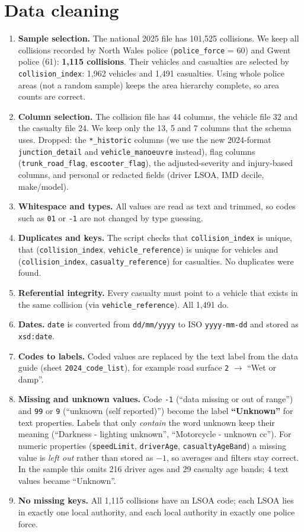 \documentclass[10.5pt,a4paper]{article}
\begin{document}
\section{Data cleaning}
\begin{enumerate}[nosep]
\item \textbf{Sample selection.} The national 2025 file has 101,525 collisions. We keep all collisions recorded by North Wales police (\texttt{police\_force} = 60) and Gwent police (61): \textbf{1,115 collisions}. Their vehicles and casualties are selected by \texttt{collision\_index}: 1,962 vehicles and 1,491 casualties. Using whole police areas (not a random sample) keeps the area hierarchy complete, so area counts are correct.
\item \textbf{Column selection.} The collision file has 44 columns, the vehicle file 32 and the casualty file 24. We keep only the 13, 5 and 7 columns that the schema uses. Dropped: the \texttt{*\_historic} columns (we use the new 2024-format \texttt{junction\_detail} and \texttt{vehicle\_manoeuvre} instead), flag columns (\texttt{trunk\_road\_flag}, \texttt{escooter\_flag}), the adjusted-severity and injury-based columns, and personal or redacted fields (driver LSOA, IMD decile, make/model).
\item \textbf{Whitespace and types.} All values are read as text and trimmed, so codes such as \texttt{01} or \texttt{-1} are not changed by type guessing.
\item \textbf{Duplicates and keys.} The script checks that \texttt{collision\_index} is unique, that (\texttt{collision\_index}, \texttt{vehicle\_reference}) is unique for vehicles and (\texttt{collision\_index}, \texttt{casualty\_reference}) for casualties. No duplicates were found.
\item \textbf{Referential integrity.} Every casualty must point to a vehicle that exists in the same collision (via \texttt{vehicle\_reference}). All 1,491 do.
\item \textbf{Dates.} \texttt{date} is converted from \texttt{dd/mm/yyyy} to ISO \texttt{yyyy-mm-dd} and stored as \texttt{xsd:date}.
\item \textbf{Codes to labels.} Coded values are replaced by the text label from the data guide (sheet \texttt{2024\_code\_list}), for example road surface \texttt{2} $\rightarrow$ ``Wet or damp''.
\item \textbf{Missing and unknown values.} Code \texttt{-1} (``data missing or out of range'') and \texttt{99} or \texttt{9} (``unknown (self reported)'') become the label \textbf{``Unknown''} for text properties. Labels that only \emph{contain} the word unknown keep their meaning (``Darkness - lighting unknown'', ``Motorcycle - unknown cc''). For numeric properties (\texttt{speedLimit}, \texttt{driverAge}, \texttt{casualtyAgeBand}) a missing value is \emph{left out} rather than stored as $-1$, so averages and filters stay correct. In the sample this omits 216 driver ages and 29 casualty age bands; 4 text values became ``Unknown''.
\item \textbf{No missing keys.} All 1,115 collisions have an LSOA code; each LSOA lies in exactly one local authority, and each local authority in exactly one police force.
\end{enumerate}
\end{document}
